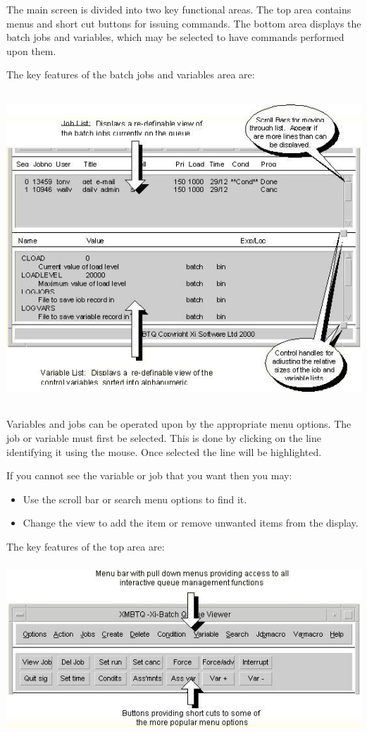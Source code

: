 The main screen is divided into two key functional areas. The top area contains menus and short cut buttons for issuing commands. The bottom
area displays the batch jobs and variables, which may be selected to have commands performed upon them.

The key features of the batch jobs and variables area are:

 \includegraphics[width=14.346cm,height=11.718cm]{img/ref13.jpg} 

Variables and jobs can be operated upon by the appropriate menu options.
The job or variable must first be selected. This is done by clicking on
the line identifying it using the mouse. Once selected the line will be
highlighted.

If you cannot see the variable or job that you want then you may:

\begin{itemize}
\item Use the scroll bar or search menu options to find it.
\item Change the view to add the item or remove unwanted items from the display.
\end{itemize}
The key features of the top area are:

 \includegraphics[width=14.376cm,height=6.346cm]{img/ref14.jpg} 

